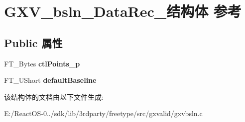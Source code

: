 \hypertarget{struct_g_x_v__bsln___data_rec__}{}\section{G\+X\+V\+\_\+bsln\+\_\+\+Data\+Rec\+\_\+结构体 参考}
\label{struct_g_x_v__bsln___data_rec__}
\subsection*{Public 属性}
\begin{DoxyCompactItemize}
\item 
\mbox{\label{struct_g_x_v__bsln___data_rec___a46827712412284771858038c98463f45}} 
F\+T\+\_\+\+Bytes {\bfseries ctl\+Points\+\_\+p}
\item 
\mbox{\label{struct_g_x_v__bsln___data_rec___a736df068fac6c2cd83a4d7d9da6bc493}} 
F\+T\+\_\+\+U\+Short {\bfseries default\+Baseline}
\end{DoxyCompactItemize}


该结构体的文档由以下文件生成\+:\begin{DoxyCompactItemize}
\item 
E\+:/\+React\+O\+S-\/0../sdk/lib/3rdparty/freetype/src/gxvalid/gxvbsln.\+c\end{DoxyCompactItemize}
